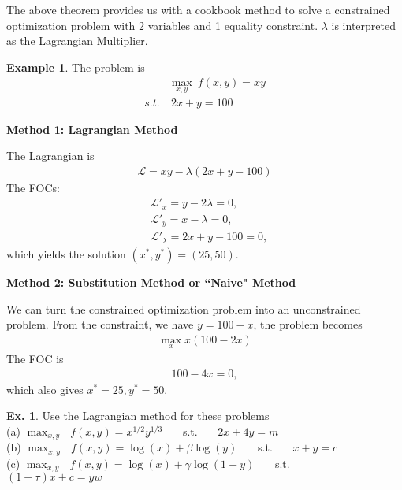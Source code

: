 \documentclass[10pt,a4paper]{book}
\theoremstyle{definition}\newtheorem{definition}{Definition}
\theoremstyle{definition}\newtheorem{fact}{Fact}
\theoremstyle{definition}\newtheorem{ex}{Ex.}
\theoremstyle{definition}\newtheorem{project}{Project}
\theoremstyle{definition}\newtheorem{problem}{Problem}
\theoremstyle{definition}\newtheorem{example}{Example}
\numberwithin{theorem}{chapter}
\numberwithin{corollary}{chapter}
\numberwithin{assumption}{chapter}
\numberwithin{definition}{chapter}
\numberwithin{prop}{chapter}
\numberwithin{notation}{chapter}
\numberwithin{problem}{chapter}
\numberwithin{example}{chapter}
\numberwithin{fact}{chapter}
\numberwithin{ex}{chapter}
\begin{document}
	The above theorem provides us with a cookbook method to solve a constrained optimization problem with 2 variables and 1 equality constraint. $\lambda$ is interpreted as the Lagrangian Multiplier.
	
	\begin{example}
		The problem is
		\begin{align*}
			& \max_{x,y} \ f(x,y) = xy \\
			s.t. & \ 2x + y = 100           
		\end{align*}
		
		\textbf{Method 1: Lagrangian Method}
		
		
		The Lagrangian is
		\begin{align*}
			\mathcal{L} = xy - \lambda (2x + y - 100) 
		\end{align*}
		The FOCs:
		\begin{align*}
			& \mathcal{L}'_x = y - 2\lambda = 0,       \\
			& \mathcal{L}'_y = x - \lambda = 0,        \\
			& \mathcal{L}'_\lambda = 2x + y - 100 = 0, 
		\end{align*}
		which yields the solution $(x^*,y^*) = (25,50)$. 
		
		\textbf{Method 2: Substitution Method or ``Naive" Method}
		
		
		We can turn the constrained optimization problem into an unconstrained problem. From the constraint, we have $y = 100 -x$, the problem becomes
		\begin{align*}
			\max_{x} x (100-2x) 
		\end{align*}
		The FOC is
		\begin{align*}
			100 - 4x = 0, 
		\end{align*}
		which also gives $x^*=25, y^* = 50$.
		
	\end{example}
	
	\begin{ex}
		Use the Lagrangian method for these problems \\
		(a) $\max_{x,y} \ \ \  f(x,y) = x^{1/2} y^{1/3}$  \ \ \ s.t.  \ \ \  $2x + 4y = m$ \\
		(b) $\max_{x,y} \ \ \  f(x,y) = \log(x) + \beta \log(y)$   \ \ \ s.t.  \ \ \   $x + y = c$ \\
		(c) $\max_{x,y} \ \ \  f(x,y) =  \log(x) + \gamma \log(1-y) $    \ \ \ s.t.  \ \ \   $(1-\tau) x  + c = yw  $
	\end{ex}
	
\end{document}
